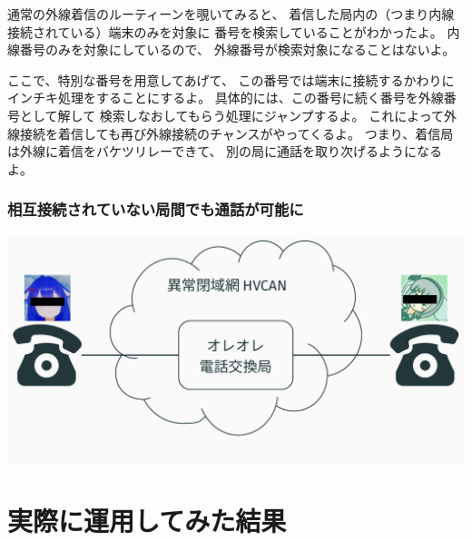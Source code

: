 \documentclass[
  lualatex,
  aspectratio=169,
  14pt
]{beamer}
\begin{document}
\begin{frame}
{    通常の外線着信のルーティーンを覗いてみると、
    着信した局内の（つまり内線接続されている）端末のみを対象に
    番号を検索していることがわかったよ。
    内線番号のみを対象にしているので、
    外線番号が検索対象になることはないよ。

    ここで、特別な番号を用意してあげて、
    この番号では端末に接続するかわりにインチキ処理をすることにするよ。
    具体的には、この番号に続く番号を外線番号として解して
    検索しなおしてもらう処理にジャンプするよ。
    これによって外線接続を着信しても再び外線接続のチャンスがやってくるよ。
    つまり、着信局は外線に着信をバケツリレーできて、
    別の局に通話を取り次げるようになるよ。
  }
\end{frame}

\begin{frame}
  \frametitle{相互接続されていない局間でも通話が可能に}

  \includegraphics[page=7,width=\linewidth]{./images/pictures.pdf}
\end{frame}

\section{実際に運用してみた結果}
\end{document}
